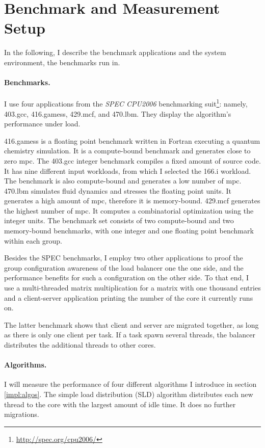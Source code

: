 \section{Benchmark and Measurement Setup}

In the following, I describe the benchmark applications and the
system environment, the benchmarks run in.

\paragraph{Benchmarks.}
I use four applications from the \emph{SPEC CPU2006} benchmarking
suit\footnote{\url{http://spec.org/cpu2006/}}:
namely, 403.gcc, 416.gamess, 429.mcf, and 470.lbm.
They display the algorithm's performance under load.

416.gamess is a floating point benchmark written in Fortran executing a quantum
chemistry simulation.
It is a compute-bound benchmark and generates close to zero \gls{mpc}.
The 403.gcc integer benchmark compiles a fixed amount of source code.
It has nine different input workloads, from which I selected the 166.i
workload.
The benchmark is also compute-bound and generates a low number of \gls{mpc}.
470.lbm simulates fluid dynamics and stresses the floating point units.
It generates a high amount of \gls{mpc}, therefore it is memory-bound.
429.mcf generates the highest number of \gls{mpc}.
It computes a combinatorial optimization using the integer units.
The benchmark set consists of two compute-bound and two memory-bound
benchmarks, with one integer and one floating point benchmark within each group.

Besides the SPEC benchmarks, I employ two other applications to proof the
group configuration awareness of the load balancer one the one side, and the
performance benefits for such a configuration on the other side.
To that end, I use a multi-threaded matrix multiplication for a matrix with
one thousand entries and a client-server application printing the number of the
core it currently runs on.

The latter benchmark shows that client and server are migrated together, as
long as there is only one client per task.
If a task spawn several threads, the balancer distributes the additional
threads to other cores.


\paragraph{Algorithms.}
I will measure the performance of four different algorithms I introduce in
section \ref{impl:algos}.
The simple load distribution (SLD) algorithm distributes each new thread to the
core with the largest amount of idle time.
It does no further migrations.

